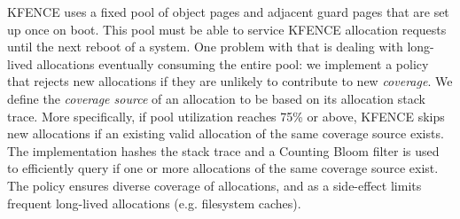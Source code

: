 KFENCE uses a fixed pool of object pages and adjacent guard pages that are set
up once on boot. This pool must be able to service KFENCE allocation requests
until the next reboot of a system. One problem with that is dealing with
long-lived allocations eventually consuming the entire pool: we implement a
policy that rejects new allocations if they are unlikely to contribute to new
\emph{coverage}. We define the \emph{coverage source} of an allocation to be
based on its allocation stack trace. More specifically, if pool utilization
reaches 75\% or above, KFENCE skips new allocations if an existing valid
allocation of the same coverage source exists. The implementation hashes the
stack trace and a Counting Bloom filter is used to efficiently query if one or
more allocations of the same coverage source exist. The policy ensures diverse
coverage of allocations, and as a side-effect limits frequent long-lived
allocations (e.g.  filesystem caches).
